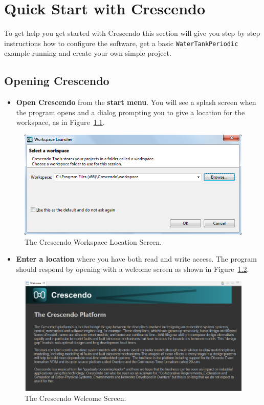 \documentclass{crescendorepchap}
\begin{document}

\chapter{Quick Start with Crescendo} \label{chap:gettingstarted}

To get help you get started with Crescendo this section will give you step
by step instructions how to configure the software, get a basic
\texttt{WaterTankPeriodic} example running and create your own simple project.


\section{Opening Crescendo}

\begin{itemize}
\item
  \textbf{Open Crescendo} from the \textbf{start menu}.
You will see a splash screen when the program opens and a dialog
prompting you to give a location for the workspace, as in Figure~\ref{fig:wsloc}.
\end{itemize}

\begin{figure}[htbp]
\centering
\includegraphics[width=.8\textwidth]{images/DestecsWorkspaceLocation.png}
\caption{The Crescendo Workspace Location Screen.\label{fig:wsloc}}
\end{figure}

\begin{itemize}
\item
  \textbf{Enter a location} where you have both read and write access.
The program should respond by opening with a welcome screen as shown in Figure~\ref{fig:welcome}.
\end{itemize}

\begin{figure}[htbp]
\centering
\includegraphics[width=.8\textwidth]{images/DestecsSplash.png}
\caption{The Crescendo Welcome Screen.\label{fig:welcome}}
\end{figure}
\end{document}
